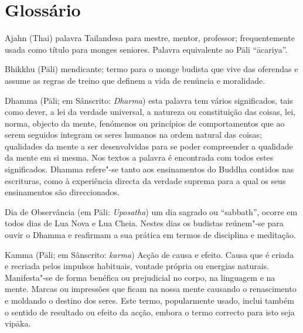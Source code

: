 \chapter{Glossário}

\thispagestyle{bottomcenter}

\begin{glossarydescription}


\item[Ajahn] (Thai) palavra Tailandesa para mestre, mentor, professor;
  frequentemente usada como título para monges seniores. Palavra equivalente ao
  Pāli “ācariya”.


\item[Bhikkhu] (Pāli) mendicante; termo para o monge budista que vive das
  oferendas e assume as regras de treino que definem a vida de renúncia e
  moralidade.



\item[Dhamma] (Pāli; em Sânscrito: \emph{Dharma}) esta palavra tem vários
  significados, tais como dever, a lei da verdade universal, a natureza ou
  constituição das coisas, lei, norma, objecto da mente, fenómenos ou princípios
  de comportamentos que ao serem seguidos integram os seres humanos na ordem
  natural das coisas; qualidades da mente a ser desenvolvidas para se poder
  compreender a qualidade da mente em si mesma. Nos textos a palavra é
  encontrada com todos estes significados. Dhamma refere"-se tanto aos
  ensinamentos do Buddha contidos nas escrituras, como à experiência directa da
  verdade suprema para a qual os seus ensinamentos são direccionados.

\item[Dia de Observância] (em Pāli: \emph{Uposatha}) um dia sagrado ou
  “sabbath”, ocorre em todos dias de Lua Nova e Lua Cheia. Nestes dias os
  budistas reúnem"-se para ouvir o Dhamma e reafirmam a sua prática em termos de
  disciplina e meditação.








\item[Kamma] (Pāli; em Sânscrito: \emph{karma}) Acção de causa e efeito. Causa que é
  criada e recriada pelos impulsos habituais, vontade própria ou energias
  naturais. Manifesta"-se de forma benéfica ou prejudicial no corpo, na linguagem
  e na mente. Marcas ou impressões que ficam na nossa mente causando o
  renascimento e moldando o destino dos seres. Este termo, popularmente usado,
  inclui também o sentido de resultado ou efeito da acção, embora o termo
  correcto para isto seja vipāka.


\end{glossarydescription}
